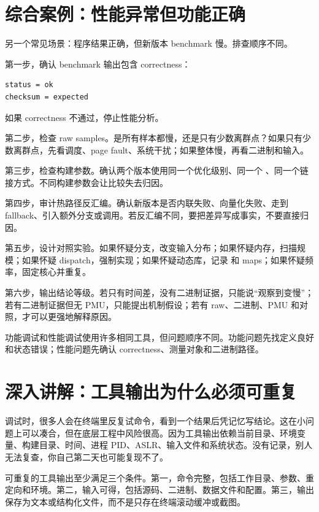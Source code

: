\section{综合案例：性能异常但功能正确}

另一个常见场景：程序结果正确，但新版本 benchmark 慢。排查顺序不同。

第一步，确认 benchmark 输出包含 correctness：

\begin{lstlisting}
status = ok
checksum = expected
\end{lstlisting}

如果 correctness 不通过，停止性能分析。

第二步，检查 raw samples。是所有样本都慢，还是只有少数离群点？如果只有少数离群点，先看调度、page fault、系统干扰；如果整体慢，再看二进制和输入。

第三步，检查构建参数。确认两个版本使用同一个优化级别、同一个 、同一个链接方式。不同构建参数会让比较失去归因。

第四步，审计热路径反汇编。确认新版本是否内联失败、向量化失败、走到 fallback、引入额外分支或调用。若反汇编不同，要把差异写成事实，不要直接归因。

第五步，设计对照实验。如果怀疑分支，改变输入分布；如果怀疑内存，扫描规模；如果怀疑 dispatch，强制实现；如果怀疑动态库，记录  和 maps；如果怀疑频率，固定核心并重复。

第六步，输出结论等级。若只有时间差，没有二进制证据，只能说“观察到变慢”；若有二进制证据但无 PMU，只能提出机制假设；若有 raw、二进制、PMU 和对照，才可以更强地解释原因。

\begin{keyidea}
功能调试和性能调试使用许多相同工具，但问题顺序不同。功能问题先找定义良好和状态错误；性能问题先确认 correctness、测量对象和二进制路径。
\end{keyidea}

\section{深入讲解：工具输出为什么必须可重复}

调试时，很多人会在终端里反复试命令，看到一个结果后凭记忆写结论。这在小问题上可以凑合，但在底层工程中风险很高。因为工具输出依赖当前目录、环境变量、构建目录、时间、进程 PID、ASLR、输入文件和系统状态。没有记录，别人无法复查，你自己第二天也可能复现不了。

可重复的工具输出至少满足三个条件。第一，命令完整，包括工作目录、参数、重定向和环境。第二，输入可得，包括源码、二进制、数据文件和配置。第三，输出保存为文本或结构化文件，而不是只存在终端滚动缓冲或截图。


